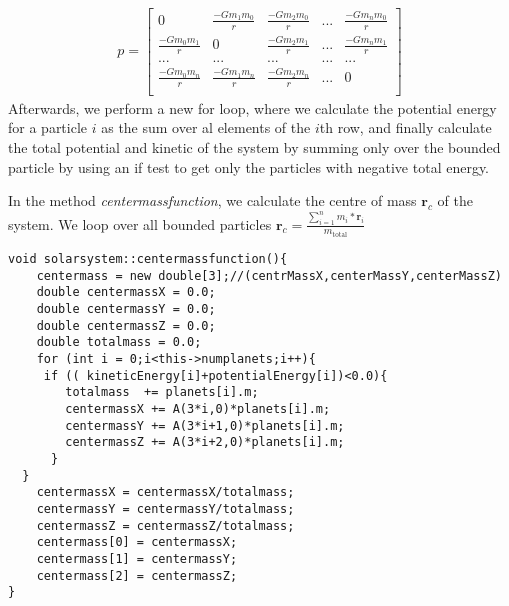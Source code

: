 \documentclass[10pt,a4paper]{article}
\begin{document}
\begin{align}
p=
\begin{bmatrix}
0 & \frac{-Gm_1m_0}{r} & \frac{-Gm_2m_0}{r} & ... & \frac{-Gm_nm_0}{r}  \\
\frac{-Gm_0m_1}{r} & 0 & \frac{-Gm_2m_1}{r} & ... & \frac{-Gm_nm_1}{r}  \\
... & ... & ... & ... & ... \\
\frac{-Gm_0m_n}{r} & \frac{-Gm_1m_n}{r} & \frac{-Gm_2m_n}{r} & ... & 0  \\
\end{bmatrix}
\end{align} 
Afterwards, we perform a new for loop, where we calculate the potential energy for a particle $i$ as the sum over al elements of the $i$th row, and finally calculate the total potential and kinetic of the system by summing only over the bounded particle by using an if test to get only the particles with negative total energy.

In the method \emph{centermassfunction}, we calculate the centre of mass $\mathbf{r}_c$ of the system. We loop over all bounded particles $\mathbf{r}_c = \frac{\sum\limits_{i=1}^n m_i*\mathbf{r}_i}{m_\mathrm{total}}$
\begin{lstlisting} 
void solarsystem::centermassfunction(){
    centermass = new double[3];//(centrMassX,centerMassY,centerMassZ)
    double centermassX = 0.0;
    double centermassY = 0.0;
    double centermassZ = 0.0;
    double totalmass = 0.0;
    for (int i = 0;i<this->numplanets;i++){
     if (( kineticEnergy[i]+potentialEnergy[i])<0.0){
        totalmass  += planets[i].m;
        centermassX += A(3*i,0)*planets[i].m;
        centermassY += A(3*i+1,0)*planets[i].m;
        centermassZ += A(3*i+2,0)*planets[i].m;
      }
  }
    centermassX = centermassX/totalmass;
    centermassY = centermassY/totalmass;
    centermassZ = centermassZ/totalmass;
    centermass[0] = centermassX;
    centermass[1] = centermassY;
    centermass[2] = centermassZ;
}
\end{lstlisting}
 
  
\end{document}
